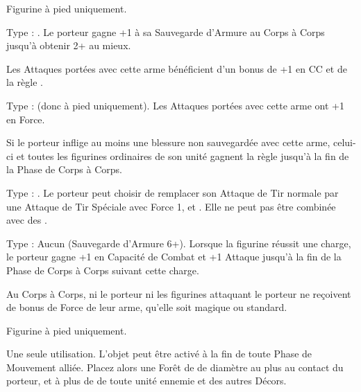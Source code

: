 






\startarmymagicalitems

\armymagicalweapons

\startpricelist

Figurine à pied uniquement.

Type : \gw{}. Le porteur gagne +1 à sa Sauvegarde d'Armure au Corps à Corps jusqu'à obtenir 2+ au mieux.

Les Attaques portées avec cette arme bénéficient d'un bonus de +1 en CC et de la règle .

Type : \spear{} (donc à pied uniquement). Les Attaques portées avec cette arme ont +1 en Force.

Si le porteur inflige au moins une blessure non sauvegardée avec cette arme, celui-ci et toutes les figurines ordinaires de son unité gagnent la règle \distracting{} jusqu'à la fin de la Phase de Corps à Corps.

Type : \longbow{}. Le porteur peut choisir de remplacer son Attaque de Tir normale par une Attaque de Tir Spéciale avec Force 1, \poisonedattacks{} et . Elle ne peut pas être combinée avec des \feyarrows{}.

\endpricelist

\armymagicalarmour

\startpricelist

Type : Aucun (Sauvegarde d'Armure 6+). Lorsque la figurine réussit une charge, le porteur gagne +1 en Capacité de Combat et +1 Attaque jusqu'à la fin de la Phase de Corps à Corps suivant cette charge.

\endpricelist

\armytalismans

\startpricelist

Au Corps à Corps, ni le porteur ni les figurines attaquant le porteur ne reçoivent de bonus de Force de leur arme, qu'elle soit magique ou standard.

\endpricelist

\armyenchanteditems

\startpricelist

Figurine à pied uniquement.

Une seule utilisation. L'objet peut être activé à la fin de toute Phase de Mouvement alliée. Placez alors une Forêt de  de diamètre au plus au contact du porteur, et à plus de  de toute unité ennemie et des autres Décors.

